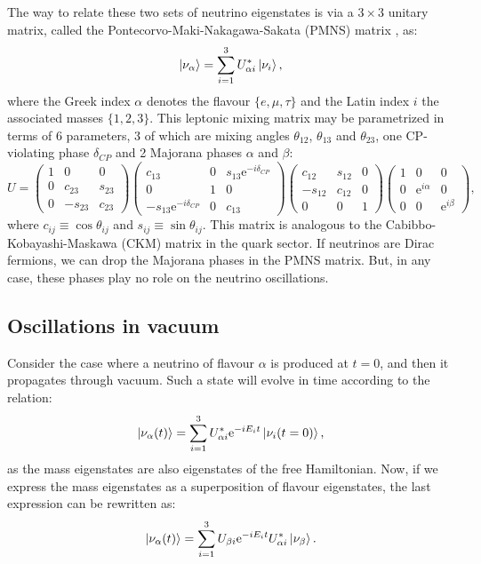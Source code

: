 The way to relate these two sets of neutrino eigenstates is via a $3 \times 3$ unitary matrix, called the Pontecorvo-Maki-Nakagawa-Sakata (PMNS) matrix \cite{Pontecorvo1957, Maki1962}, as:
\begin{equation}\label{2.1}
\ket{\nu_{\alpha}} = \sum_{i=1}^{3} U^{*}_{\alpha i} \ket{\nu_{i}},
\end{equation}
where the Greek index $\alpha$ denotes the flavour $\{e,\mu,\tau\}$ and the Latin index $i$ the associated masses $\{1,2,3\}$. This leptonic mixing matrix may be parametrized in terms of 6 parameters, 3 of which are mixing angles $\theta_{12}$, $\theta_{13}$ and $\theta_{23}$, one CP-violating phase $\delta_{CP}$ and 2 Majorana phases $\alpha$ and $\beta$:
\begin{equation}\label{2.2}
U = \left(\begin{array}{ccc}1&0&0\\0&c_{23}&s_{23}\\0&-s_{23}&c_{23}\end{array}\right) \left(\begin{array}{ccc}c_{13}&0&s_{13} \mathrm{e}^{-i\delta_{CP}}\\0&1&0\\-s_{13} \mathrm{e}^{-i\delta_{CP}}&0&c_{13}\end{array}\right) \left(\begin{array}{ccc}c_{12}&s_{12}&0\\-s_{12}&c_{12}&0\\0&0&1\end{array}\right) \left(\begin{array}{ccc}1&0&0\\0&\mathrm{e}^{i\alpha}&0\\0&0&\mathrm{e}^{i\beta}\end{array}\right),
\end{equation}
where $c_{ij} \equiv \cos \theta_{ij}$ and $s_{ij} \equiv \sin \theta_{ij}$. This matrix is analogous to the Cabibbo-Kobayashi-Maskawa (CKM) matrix in the quark sector. If neutrinos are Dirac fermions, we can drop the Majorana phases in the PMNS matrix. But, in any case, these phases play no role on the neutrino oscillations.

\subsection{Oscillations in vacuum}

Consider the case where a neutrino of flavour $\alpha$ is produced at $t=0$, and then it propagates through vacuum. Such a state will evolve in time according to the relation:
\begin{equation}\label{2.3}
\ket{\nu_{\alpha}(t)} = \sum_{i=1}^{3} U^{*}_{\alpha i} \mathrm{e}^{-iE_{i}t} \ket{\nu_{i}(t=0)},
\end{equation}
as the mass eigenstates are also eigenstates of the free Hamiltonian. Now, if we express the mass eigenstates as a superposition of flavour eigenstates, the last expression can be rewritten as:
\begin{equation}\label{2.4}
\ket{\nu_{\alpha}(t)} = \sum_{i=1}^{3} U_{\beta i} \mathrm{e}^{-iE_{i}t} U^{*}_{\alpha i} \ket{\nu_{\beta}}.
\end{equation}

